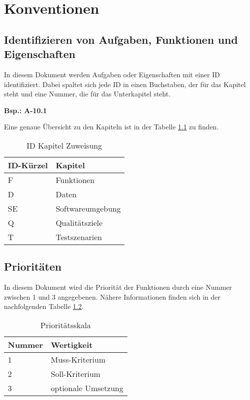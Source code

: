 
\chapter{Konventionen}
\section{Identifizieren von Aufgaben, Funktionen und Eigenschaften}
In diesem Dokument werden Aufgaben oder Eigenschaften mit einer ID identifiziert.
Dabei spaltet sich jede ID in einen Buchstaben, der für das Kapitel steht und eine Nummer, die für das Unterkapitel steht.\\
\begin{center}
    \textbf{Bsp.: A-10.1}
\end{center}
Eine genaue Übersicht zu den Kapiteln ist in der Tabelle \ref{einleitung:kapitel} zu finden.
\begin{table}[H]
    \caption{ID Kapitel Zuweisung}
    \label{einleitung:kapitel}
    \begin{tabularx}{\textwidth}{|l|X|}
        \toprule
        \textbf{ID-Kürzel} & \textbf{Kapitel} \\
        \endhead
        \hline
        F & Funktionen \\
        D & Daten \\
        SE & Softwareumgebung \\
        Q & Qualitätsziele \\
        T & Testszenarien \\
        \hline
    \end{tabularx}
\end{table}

\section{Prioritäten}
In diesem Dokument wird die Priorität der Funktionen durch eine Nummer zwischen 1 und 3 angegebenen. Nähere Informationen finden sich in der nachfolgenden Tabelle \ref{einleitung:priority}.
\begin{table}[H]
    \caption{Prioritätsskala}
    \label{einleitung:priority}
    \begin{tabularx}{\textwidth}{|l|X|}
        \toprule
        \textbf{Nummer} & \textbf{Wertigkeit}\\
        \endhead
        \hline
        1 & Muss-Kriterium\\
        2 & Soll-Kriterium\\
        3 & optionale Umsetzung\\
        \hline
    \end{tabularx}
\end{table}
